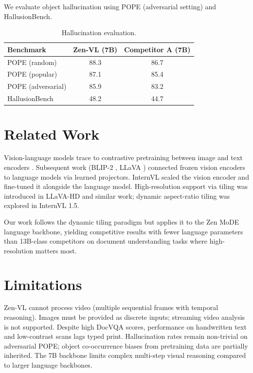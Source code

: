 \documentclass[11pt,a4paper]{article}
\begin{document}
We evaluate object hallucination using POPE (adversarial setting) and HallusionBench.

\begin{table}[H]
\centering
\caption{Hallucination evaluation.}
\label{tab:hall}
\begin{tabular}{lcc}
\toprule
\textbf{Benchmark} & \textbf{Zen-VL (7B)} & \textbf{Competitor A (7B)} \\
\midrule
POPE (random)       & 88.3 & 86.7 \\
POPE (popular)      & 87.1 & 85.4 \\
POPE (adversarial)  & 85.9 & 83.2 \\
HallusionBench      & 48.2 & 44.7 \\
\bottomrule
\end{tabular}
\end{table}

\section{Related Work}

Vision-language models trace to contrastive pretraining between image and text encoders
\cite{radford2021clip}. Subsequent work (BLIP-2 \cite{li2023blip2}, LLaVA \cite{liu2023llava})
connected frozen vision encoders to language models via learned projectors. InternVL
\cite{chen2023internvl} scaled the vision encoder and fine-tuned it alongside the language
model. High-resolution support via tiling was introduced in LLaVA-HD and similar work;
dynamic aspect-ratio tiling was explored in InternVL 1.5.

Our work follows the dynamic tiling paradigm but applies it to the Zen MoDE language backbone,
yielding competitive results with fewer language parameters than 13B-class competitors on
document understanding tasks where high-resolution matters most.

\section{Limitations}

Zen-VL cannot process video (multiple sequential frames with temporal reasoning). Images
must be provided as discrete inputs; streaming video analysis is not supported. Despite high
DocVQA scores, performance on handwritten text and low-contrast scans lags typed print.
Hallucination rates remain non-trivial on adversarial POPE; object co-occurrence biases
from pretraining data are partially inherited. The 7B backbone limits complex multi-step
visual reasoning compared to larger language backbones.
\end{document}
